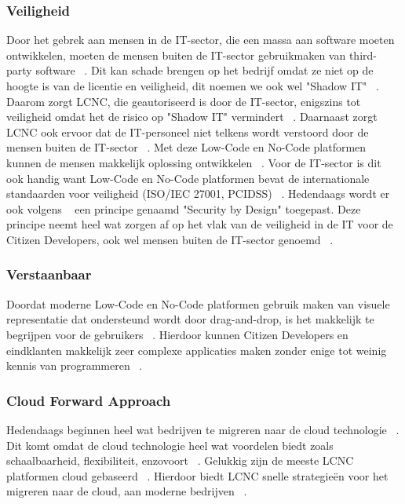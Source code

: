 \subsubsection*{Veiligheid}
\label{sub:veiligheid}
Door het gebrek aan mensen in de IT-sector, die een massa aan software moeten ontwikkelen, moeten de mensen buiten 
de IT-sector gebruikmaken van third-party software ~\autocite{Yan2021}. Dit kan schade brengen op het bedrijf omdat ze niet op de hoogte is 
van de licentie en veiligheid, dit noemen we ook wel "Shadow IT" ~\autocite{Yan2021}. Daarom zorgt LCNC, die geautoriseerd is door de IT-sector, enigszins tot veiligheid omdat het
de risico op "Shadow IT" vermindert ~\autocite{Yan2021}. Daarnaast zorgt LCNC ook ervoor dat de IT-personeel niet telkens wordt verstoord door de mensen buiten de IT-sector ~\autocite{Yan2021}.
Met deze Low-Code en No-Code platformen kunnen de mensen makkelijk oplossing ontwikkelen ~\autocite{Yan2021}. Voor de IT-sector is dit ook handig want Low-Code en No-Code platformen bevat 
de internationale standaarden voor veiligheid (ISO/IEC 27001, PCIDSS) ~\autocite{Sufi_2023}. Hedendaags wordt er ook volgens ~\textcite{Sufi_2023} een principe genaamd "Security by Design" toegepast.
Deze principe neemt heel wat zorgen af op het vlak van de veiligheid in de IT voor de Citizen Developers,  ook wel mensen buiten de IT-sector genoemd ~\autocite{Sufi_2023}.

\subsubsection*{Verstaanbaar}
\label{sub:Verstaanbaar}
Doordat moderne Low-Code en No-Code platformen gebruik maken van visuele representatie dat ondersteund wordt door drag-and-drop, is het makkelijk te begrijpen voor de gebruikers ~\autocite{Sufi_2023}.
Hierdoor kunnen Citizen Developers en eindklanten makkelijk zeer complexe applicaties maken zonder enige tot weinig kennis van programmeren ~\autocite{Sufi_2023}.

\subsubsection*{Cloud Forward Approach}
\label{sub:cloud-forward-approach}
Hedendaags beginnen heel wat bedrijven te migreren naar de cloud technologie ~\autocite{Sufi_2023}.
Dit komt omdat de cloud technologie heel wat voordelen biedt zoals schaalbaarheid, flexibiliteit, enzovoort ~\autocite{Sufi_2023}.
Gelukkig zijn de meeste LCNC platformen cloud gebaseerd ~\autocite{Sufi_2023}. 
Hierdoor biedt LCNC snelle strategieën voor het migreren naar de cloud, aan moderne bedrijven ~\autocite{Sufi_2023}.




